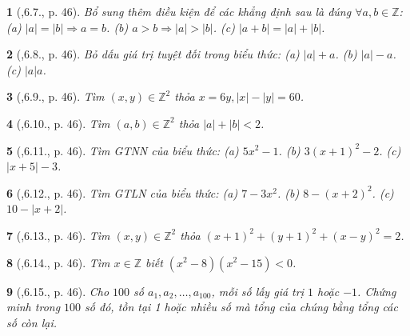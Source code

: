 \documentclass{article}
\newtheorem{baitoan}{}
\begin{document}
\begin{baitoan}[\cite{TLCT_THCS_Toan_6_so_hoc},6.7., p. 46]
	Bổ sung thêm điều kiện để các khẳng định sau là đúng $\forall a,b\in\mathbb{Z}$: (a) $|a| = |b|\Rightarrow a = b$. (b) $a > b\Rightarrow|a| > |b|$. (c) $|a + b| = |a| + |b|$.
\end{baitoan}

\begin{baitoan}[\cite{TLCT_THCS_Toan_6_so_hoc},6.8., p. 46]
	Bỏ dấu giá trị tuyệt đối trong biểu thức: (a) $|a| + a$. (b) $|a| - a$. (c) $|a|a$.
\end{baitoan}

\begin{baitoan}[\cite{TLCT_THCS_Toan_6_so_hoc},6.9., p. 46]
	Tìm $(x,y)\in\mathbb{Z}^2$ thỏa $x = 6y,|x| - |y| = 60$.
\end{baitoan}

\begin{baitoan}[\cite{TLCT_THCS_Toan_6_so_hoc},6.10., p. 46]
	Tìm $(a,b)\in\mathbb{Z}^2$ thỏa $|a| + |b| < 2$.
\end{baitoan}

\begin{baitoan}[\cite{TLCT_THCS_Toan_6_so_hoc},6.11., p. 46]
	Tìm {\rm GTNN} của biểu thức: (a) $5x^2 - 1$. (b) $3(x + 1)^2 - 2$. (c) $|x + 5| - 3$.
\end{baitoan}

\begin{baitoan}[\cite{TLCT_THCS_Toan_6_so_hoc},6.12., p. 46]
	Tìm {\rm GTLN} của biểu thức: (a) $7 - 3x^2$. (b) $8 - (x + 2)^2$. (c) $10 - |x + 2|$.
\end{baitoan}

\begin{baitoan}[\cite{TLCT_THCS_Toan_6_so_hoc},6.13., p. 46]
	Tìm $(x,y)\in\mathbb{Z}^2$ thỏa $(x + 1)^2 + (y + 1)^2 + (x - y)^2 = 2$.
\end{baitoan}

\begin{baitoan}[\cite{TLCT_THCS_Toan_6_so_hoc},6.14., p. 46]
	Tìm $x\in\mathbb{Z}$ biết $(x^2 - 8)(x^2 - 15) < 0$.
\end{baitoan}

\begin{baitoan}[\cite{TLCT_THCS_Toan_6_so_hoc},6.15., p. 46]
	Cho $100$ số $a_1,a_2,\ldots,a_{100}$, mỗi số lấy giá trị $1$ hoặc $-1$. Chứng minh trong $100$ số đó, tồn tại 1 hoặc nhiều số mà tổng của chúng bằng tổng các số còn lại.
\end{baitoan}
\end{document}
